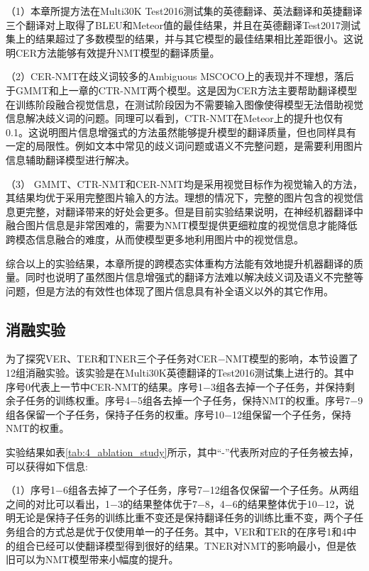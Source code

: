 （1）本章所提方法在Multi30K Test2016测试集的英德翻译、英法翻译和英捷翻译三个翻译对上取得了BLEU和Meteor值的最佳结果，并且在英德翻译Test2017测试集上的结果超过了多数模型的结果，并与其它模型的最佳结果相比差距很小。这说明CER方法能够有效提升NMT模型的翻译质量。

（2）CER-NMT在歧义词较多的Ambiguous MSCOCO上的表现并不理想，落后于GMMT和上一章的CTR-NMT两个模型。这是因为CER方法主要帮助翻译模型在训练阶段融合视觉信息，在测试阶段因为不需要输入图像使得模型无法借助视觉信息解决歧义词的问题。同理可以看到，CTR-NMT在Meteor上的提升也仅有0.1。这说明图片信息增强式的方法虽然能够提升模型的翻译质量，但也同样具有一定的局限性。例如文本中常见的歧义词问题或语义不完整问题，是需要利用图片信息辅助翻译模型进行解决。

（3）%
GMMT、CTR-NMT和CER-NMT均是采用视觉目标作为视觉输入的方法，其结果均优于采用完整图片输入的方法。理想的情况下，完整的图片包含的视觉信息更完整，对翻译带来的好处会更多。但是目前实验结果说明，在神经机器翻译中融合图片信息是非常困难的，需要为NMT模型提供更细粒度的视觉信息才能降低跨模态信息融合的难度，从而使模型更多地利用图片中的视觉信息。

综合以上的实验结果，本章所提的跨模态实体重构方法能有效地提升机器翻译的质量。同时也说明了虽然图片信息增强式的翻译方法难以解决歧义词及语义不完整等问题，但是方法的有效性也体现了图片信息具有补全语义以外的其它作用。

\subsection{消融实验}
\label{sec:4_ablation_study}
为了探究VER、TER和TNER三个子任务对CER$-$NMT模型的影响，本节设置了12组消融实验。该实验是在Multi30K英德翻译的Test2016测试集上进行的。其中序号0代表上一节中CER-NMT的结果。序号1$-$3组各去掉一个子任务，并保持剩余子任务的训练权重。序号4$-$5组各去掉一个子任务，保持NMT的权重。序号7$-$9组各保留一个子任务，保持子任务的权重。序号10$-$12组保留一个子任务，保持NMT的权重。


实验结果如表\ref{tab:4_ablation_study}所示，其中“-”代表所对应的子任务被去掉，可以获得如下信息:

（1）序号1$-$6组各去掉了一个子任务，序号7$-$12组各仅保留一个子任务。从两组之间的对比可以看出，1$-$3的结果整体优于7$-$8，4$-$6的结果整体优于10$-$12，说明无论是保持子任务的训练比重不变还是保持翻译任务的训练比重不变，两个子任务组合的方式总是优于仅使用单一的子任务。其中，VER和TER的在序号1和4中的组合已经可以使翻译模型得到很好的结果。TNER对NMT的影响最小，但是依旧可以为NMT模型带来小幅度的提升。


